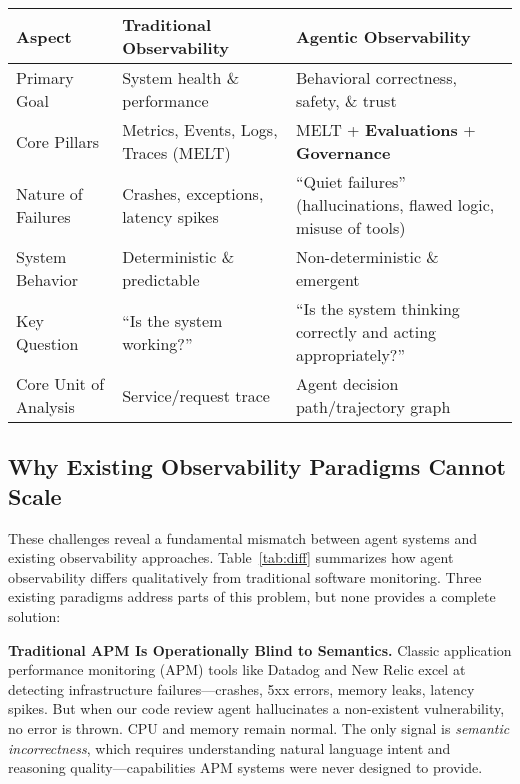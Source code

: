 \documentclass[sigplan,screen,9pt]{acmart}
\begin{document}
\begin{table*}[t]
  \caption{Traditional vs. Agentic Observability: A Comparative Framework}
  \label{tab:diff}
  \centering
  \begin{tabular}{@{}p{3cm}p{5.5cm}p{5.5cm}@{}}
    \toprule
    \textbf{Aspect} &
    \textbf{Traditional Observability} &
    \textbf{Agentic Observability} \\
    \midrule
    Primary Goal &
    System health \& performance &
    Behavioral correctness, safety, \& trust \\
    Core Pillars &
    Metrics, Events, Logs, Traces (MELT) &
    MELT + \textbf{Evaluations} + \textbf{Governance} \\
    Nature of Failures &
    Crashes, exceptions, latency spikes &
    ``Quiet failures'' (hallucinations, flawed logic, misuse of tools) \\
    System Behavior &
    Deterministic \& predictable &
    Non-deterministic \& emergent \\
    Key Question &
    ``Is the system working?'' &
    ``Is the system thinking correctly and acting appropriately?'' \\
    Core Unit of Analysis &
    Service/request trace &
    Agent decision path/trajectory graph \\
    \bottomrule
  \end{tabular}
\end{table*}

\subsection{Why Existing Observability Paradigms Cannot Scale}

These challenges reveal a fundamental mismatch between agent systems and existing observability approaches. Table~\ref{tab:diff} summarizes how agent observability differs qualitatively from traditional software monitoring. Three existing paradigms address parts of this problem, but none provides a complete solution:

\textbf{Traditional APM Is Operationally Blind to Semantics.} Classic application performance monitoring (APM) tools like Datadog and New Relic excel at detecting infrastructure failures—crashes, 5xx errors, memory leaks, latency spikes. But when our code review agent hallucinates a non-existent vulnerability, no error is thrown. CPU and memory remain normal. The only signal is \emph{semantic incorrectness}, which requires understanding natural language intent and reasoning quality—capabilities APM systems were never designed to provide.
\end{document}
